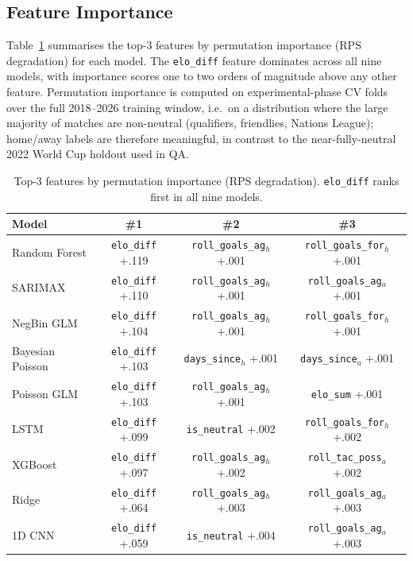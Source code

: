 \documentclass[conference]{IEEEtran}
\begin{document}
\subsection{Feature Importance}

Table~\ref{tab:importance} summarises the top-3 features by permutation
importance (RPS degradation) for each model.  The \texttt{elo\_diff}
feature dominates across all nine models, with importance scores one to
two orders of magnitude above any other feature.  Permutation importance
is computed on experimental-phase CV folds over the full 2018--2026
training window, i.e.\ on a distribution where the large majority of
matches are non-neutral (qualifiers, friendlies, Nations League);
home/away labels are therefore meaningful, in contrast to the
near-fully-neutral 2022 World Cup holdout used in QA.

\begin{table}[t]
  \centering
  \caption{Top-3 features by permutation importance (RPS degradation).
  \texttt{elo\_diff} ranks first in all nine models.}
  \label{tab:importance}
  \begin{tabular}{lccc}
    \toprule
    Model & \#1 & \#2 & \#3 \\
    \midrule
    Random Forest & \texttt{elo\_diff} \scriptsize{+.119}
      & \texttt{roll\_goals\_ag$_h$} \scriptsize{+.001}
      & \texttt{roll\_goals\_for$_h$} \scriptsize{+.001} \\
    SARIMAX & \texttt{elo\_diff} \scriptsize{+.110}
      & \texttt{roll\_goals\_ag$_h$} \scriptsize{+.001}
      & \texttt{roll\_goals\_ag$_a$} \scriptsize{+.001} \\
    NegBin GLM & \texttt{elo\_diff} \scriptsize{+.104}
      & \texttt{roll\_goals\_ag$_h$} \scriptsize{+.001}
      & \texttt{roll\_goals\_for$_h$} \scriptsize{+.001} \\
    Bayesian Poisson & \texttt{elo\_diff} \scriptsize{+.103}
      & \texttt{days\_since$_h$} \scriptsize{+.001}
      & \texttt{days\_since$_a$} \scriptsize{+.001} \\
    Poisson GLM & \texttt{elo\_diff} \scriptsize{+.103}
      & \texttt{roll\_goals\_ag$_h$} \scriptsize{+.001}
      & \texttt{elo\_sum} \scriptsize{+.001} \\
    LSTM & \texttt{elo\_diff} \scriptsize{+.099}
      & \texttt{is\_neutral} \scriptsize{+.002}
      & \texttt{roll\_goals\_for$_h$} \scriptsize{+.002} \\
    XGBoost & \texttt{elo\_diff} \scriptsize{+.097}
      & \texttt{roll\_goals\_ag$_h$} \scriptsize{+.002}
      & \texttt{roll\_tac\_poss$_a$} \scriptsize{+.002} \\
    Ridge & \texttt{elo\_diff} \scriptsize{+.064}
      & \texttt{roll\_goals\_ag$_h$} \scriptsize{+.003}
      & \texttt{roll\_goals\_ag$_a$} \scriptsize{+.003} \\
    1D CNN & \texttt{elo\_diff} \scriptsize{+.059}
      & \texttt{is\_neutral} \scriptsize{+.004}
      & \texttt{roll\_goals\_ag$_a$} \scriptsize{+.003} \\
    \bottomrule
  \end{tabular}
\end{table}
\end{document}
